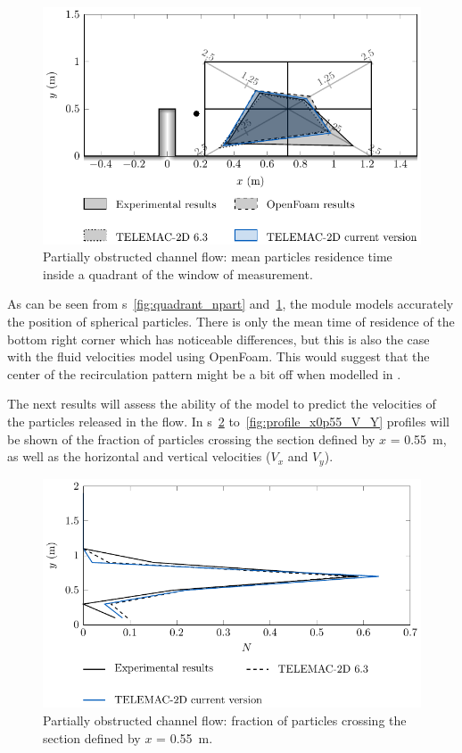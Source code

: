 \begin{figure}[H]
\begin{center}
  \includegraphics[]{./img/CanalAlgQuadrantTrsd}
\end{center}
\caption{Partially obstructed channel flow: mean particles residence time inside a quadrant of the window of measurement.}
\label{fig:quadrant_tresid}
\end{figure}

As can be seen from \figurename{}s~\ref{fig:quadrant_npart}
and~\ref{fig:quadrant_tresid}, the  module
models accurately the position of spherical particles.
There is only the mean time of residence of the bottom right corner which has
noticeable differences, but this is also the case with the fluid velocities
model using OpenFoam.
This would suggest that the center of the recirculation pattern might be a bit
off when modelled in .

The next results will assess the ability of the model to predict the velocities
of the particles released in the flow.
In \figurename{}s~\ref{fig:profile_x0p55_N} to~\ref{fig:profile_x0p55_V_Y}
profiles will be shown of the fraction of particles crossing the section defined
by $x$ = 0.55~m, as well as the horizontal and vertical velocities ($V_x$ and $V_y$).

\begin{figure}[h!]
\begin{center}
  \includegraphics[]{./img/CanalAlgProfile_x0p55_N}
\end{center}
\caption{Partially obstructed channel flow: fraction of particles crossing the section defined by $x$ = 0.55~m.}
\label{fig:profile_x0p55_N}
\end{figure}

